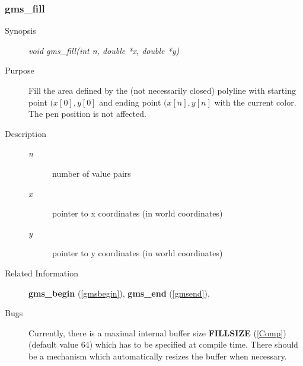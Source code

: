 \subsubsection{gms\_fill\label{gmsfill}}
\begin{description}
\item[Synopsis]\mbox{}


{\em void    gms\_fill(int n, double *x, double *y)\/}
\item[Purpose]\mbox{}


Fill the area defined by the (not necessarily closed) 
polyline
with starting point $(x[0],y[0]$ and
ending point $(x[n],y[n]$ with the current color.
The pen position is not affected.
\item[Description]\mbox{}


\begin{description}
\item[{\em n\/}]\mbox{}

 number of value pairs
\item[{\em x\/}]\mbox{}

 pointer to x coordinates (in world coordinates)
\item[{\em y\/}]\mbox{}

 pointer to y coordinates (in world coordinates)
\end{description}

\item[Related Information]\mbox{}


{\bf gms\_begin} (\ref{gmsbegin}), 
{\bf gms\_end} (\ref{gmsend}), 
\item[Bugs]\mbox{}


Currently, there is a maximal internal buffer size 
{\bf FILLSIZE} (\ref{Comp}) (default value 64) 
which  has to be  specified at compile time.
There should be a mechanism which automatically resizes the 
buffer when necessary.
\end{description}



\newpage



